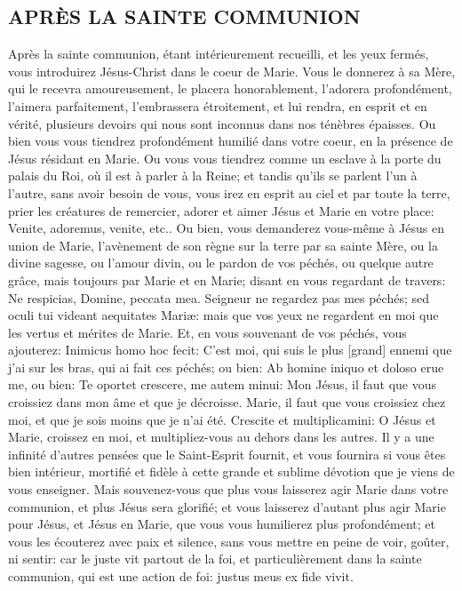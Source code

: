 \subsection{APRÈS LA SAINTE COMMUNION}
 Après la sainte communion, étant intérieurement recueilli, et les yeux fermés, vous introduirez Jésus-Christ
dans le coeur de Marie. Vous le donnerez à sa Mère, qui le recevra amoureusement, le placera honorablement,
l'adorera profondément, l'aimera parfaitement, l'embrassera étroitement, et lui rendra, en esprit et en vérité,
plusieurs devoirs qui nous sont inconnus dans nos ténèbres épaisses.
 Ou bien vous vous tiendrez profondément humilié dans votre coeur, en la présence de Jésus résidant en
Marie. Ou vous vous tiendrez comme un esclave à la porte du palais du Roi, où il est à parler à la Reine; et tandis
qu'ils se parlent l'un à l'autre, sans avoir besoin de vous, vous irez en esprit au ciel et par toute la terre, prier les
créatures de remercier, adorer et aimer Jésus et Marie en votre place: Venite, adoremus, venite, etc..
 Ou bien, vous demanderez vous-même à Jésus en union de Marie, l'avènement de son règne sur la terre par
sa sainte Mère, ou la divine sagesse, ou l'amour divin, ou le pardon de vos péchés, ou quelque autre grâce, mais
toujours par Marie et en Marie; disant en vous regardant de travers: Ne respicias, Domine, peccata mea. Seigneur
ne regardez pas mes péchés; sed oculi tui videant aequitates Mariæ: mais que vos yeux ne regardent en moi que
les vertus et mérites de Marie. Et, en vous souvenant de vos péchés, vous ajouterez: Inimicus homo hoc fecit:
C'est moi, qui suis le plus [grand] ennemi que j'ai sur les bras, qui ai fait ces péchés; ou bien: Ab homine iniquo et
doloso erue me, ou bien: Te oportet crescere, me autem minui: Mon Jésus, il faut que vous croissiez dans mon
âme et que je décroisse. Marie, il faut que vous croissiez chez moi, et que je sois moins que je n'ai été. Crescite et
multiplicamini: O Jésus et Marie, croissez en moi, et multipliez-vous au dehors dans les autres.
 Il y a une infinité d'autres pensées que le Saint-Esprit fournit, et vous fournira si vous êtes bien intérieur,
mortifié et fidèle à cette grande et sublime dévotion que je viens de vous enseigner. Mais souvenez-vous que plus
vous laisserez agir Marie dans votre communion, et plus Jésus sera glorifié; et vous laisserez d'autant plus agir
Marie pour Jésus, et Jésus en Marie, que vous vous humilierez plus profondément; et vous les écouterez avec
paix et silence, sans vous mettre en peine de voir, goûter, ni sentir: car le juste vit partout de la foi, et
particulièrement dans la sainte communion, qui est une action de foi: justus meus ex fide vivit.

